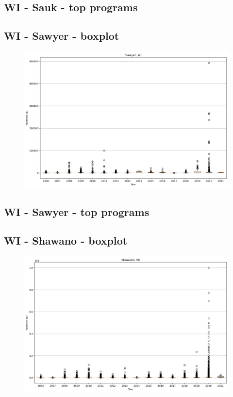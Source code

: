 \subsection*{WI - Sauk - top programs}

\newpage
\subsection*{WI - Sawyer - boxplot}
\begin{figure}[h]
\centering
\includegraphics[width=7in]{../output/boxplots/counties/Sawyer-WI_boxplot.png}
\end{figure}


\subsection*{WI - Sawyer - top programs}

\newpage
\subsection*{WI - Shawano - boxplot}
\begin{figure}[h]
\centering
\includegraphics[width=7in]{../output/boxplots/counties/Shawano-WI_boxplot.png}
\end{figure}


